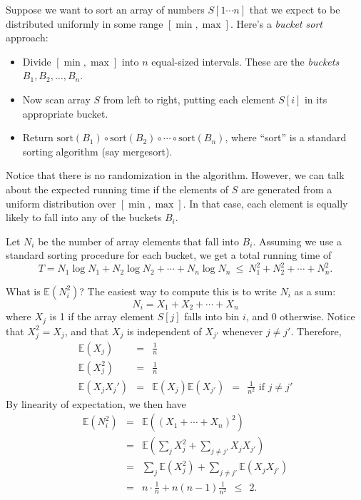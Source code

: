 \documentclass{report}
\theoremstyle{plain}
\theoremstyle{definition}
\newcommand{\E}{\mathbb{E}}
\begin{document}
Suppose we want to sort an array of numbers $S[1\cdots n]$ that we expect to be
distributed uniformly in some range $[\min,\max]$. Here's a {\it bucket sort} approach:
\begin{itemize}
\item Divide $[\min,\max]$ into $n$ equal-sized intervals. These are the {\it buckets} 
$B_1, B_2, \ldots, B_n$.
\item Now scan array $S$ from left to right, putting each element $S[i]$ in its
appropriate bucket.
\item Return $\mbox{sort}(B_1) \circ \mbox{sort}(B_2) \circ \cdots \circ \mbox{sort}(B_n)$,
where ``sort'' is a standard sorting algorithm (say mergesort).
\end{itemize}

Notice that there is no randomization in the algorithm. However, we can talk about
the expected running time if the elements of $S$ are generated from a uniform 
distribution over $[\min,\max]$. In that case, each element is equally likely to 
fall into any of the buckets $B_i$.

Let $N_i$ be the number of array elements that fall into $B_i$. Assuming
we use a standard sorting procedure for each bucket, we get a total running time of
$$ T = N_1 \log N_1 + N_2 \log N_2 + \cdots + N_n \log N_n \ \leq \ 
N_1^2 + N_2^2 + \cdots + N_n^2 .$$

What is $\E(N_i^2)$? The easiest way to compute this is to write $N_i$ as a sum:
$$ N_i = X_1 + X_2 + \cdots + X_n$$
where $X_j$ is 1 if the array element $S[j]$ falls into bin $i$, and 0 otherwise.
Notice that $X_j^2 = X_j$, and that $X_j$ is independent of $X_{j'}$ whenever $j \neq j'$.
Therefore,
\begin{eqnarray*}
\E(X_j)  &  = & \frac{1}{n} \\
\E(X_j^2) & = & \frac{1}{n} \\
\E(X_jX_j') & = & \E(X_j) \E(X_{j'}) \ \ = \ \ \frac{1}{n^2} \mbox{\ \ \ \ if $j \neq j'$}
\end{eqnarray*}
By linearity of expectation, we then have
\begin{eqnarray*}
\E(N_i^2) 
& = & \E \left( (X_1 + \cdots + X_n)^2 \right) \\
& = & \E \left( \sum_j X_j^2 + \sum_{j \neq j'} X_j X_{j'} \right) \\
& = & \sum_j \E(X_j^2) + \sum_{j \neq j'} \E(X_j X_{j'}) \\
& = & n \cdot \frac{1}{n} + n(n-1) \frac{1}{n^2} \ \ \leq \ \ 2.
\end{eqnarray*}
\end{document}
